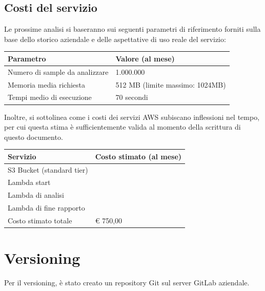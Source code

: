 \subsection{Costi del servizio}
Le prossime analisi si baseranno sui seguenti parametri di riferimento forniti sulla base dello storico aziendale e delle aspettative di uso reale del servizio:
\begin{table}[H]
    \centering
    \begin{tabular}{|l|l|}
        \hline
        \textbf{Parametro}             & \textbf{Valore (al mese)}       \\ \hline
        Numero di sample da analizzare & 1.000.000                       \\
        Memoria media richiesta        & 512 MB (limite massimo: 1024MB) \\
        Tempi medio di esecuzione      & 70 secondi                      \\ \hline
    \end{tabular}
\end{table}

Inoltre, si sottolinea come i costi dei servizi AWS subiscano inflessioni nel tempo, per cui questa stima è sufficientemente valida al momento della scrittura di questo documento.

\begin{table}[H]
    \centering
    \begin{tabular}{|l|l|}
        \hline
        \textbf{Servizio}         & \textbf{Costo stimato (al mese)} \\ \hline
        S3 Bucket (standard tier) &                                  \\
        Lambda start              &                                  \\
        Lambda di analisi         &                                  \\
        Lambda di fine rapporto   &                                  \\ \hline
        Costo stimato totale      & € 750,00                         \\ \hline
    \end{tabular}
\end{table}

\section{Versioning}
Per il versioning, è stato creato un repository Git sul server GitLab aziendale.

